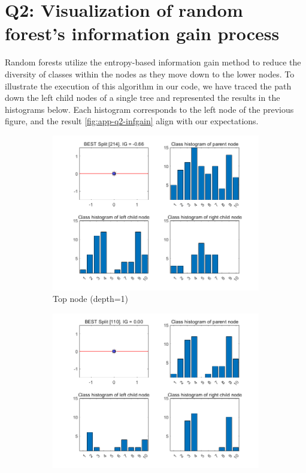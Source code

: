 \section{Q2: Visualization of random forest's information gain process}
\label{subsec:Q2-app2}
Random forests utilize the entropy-based information gain method to reduce the diversity of classes within the nodes as they move down to the lower nodes. To illustrate the execution of this algorithm in our code, we have traced the path down the left child nodes of a single tree and represented the results in the histograms below. Each histogram corresponds to the left node of the previous figure, and the result \cref{fig:app-q2-infgain} align with our expectations.

\begin{figure}[htbp]
	\centering
	\begin{subfigure}{0.33\linewidth}
		\centering
		\includegraphics[width=\linewidth]{image/q2-infgain/fig1.png}
		\caption{Top node (depth=1)}
	\end{subfigure}%
	\hfill
	\begin{subfigure}{0.33\linewidth}
		\centering
		\includegraphics[width=\linewidth]{image/q2-infgain/fig2.png}

\end{subfigure}
\end{figure}
